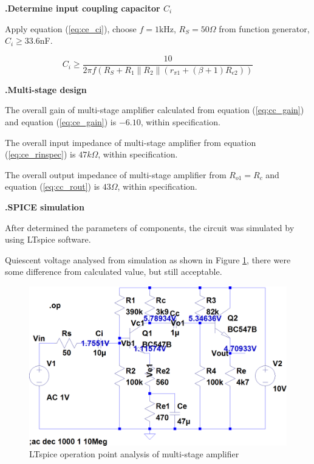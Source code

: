\documentclass[a4paper,notitlepage,10pt]{report}
\newcommand{\tab}{\hspace{0.75cm}}
\newcommand{\fontHeading}{\fontsize{12pt}{13.2pt}\selectfont}
\newcommand{\fontSubHeading}{\fontsize{10pt}{11pt}\selectfont}
\newcommand{\fontBody}{\fontsize{10pt}{11pt}\selectfont}
\newcounter{sections}
\newcounter{subsections}[sections]
\begin{document}
\begin{multicols}{2}
\fontSubHeading
{}
\textbf{.\tab Determine input coupling capacitor $C_i$}

Apply equation (\ref{eq:ce_ci}), choose $f = 1$kHz, $R_S = 50\Omega$ from function generator, $C_i \geq 33.6$nF.
\parskip=0pt

\begin{equation}
	\label{eq:ce_ci}
	C_i \geq \frac{10}{2\pi f\left(R_S + R_1 \| R_2 \| \left(r_{\pi1} + \left(\beta + 1\right)R_{e2}\right)\right)}
\end{equation}
\parskip=10pt


\fontHeading
{}
\textbf{.\tab Multi-stage design}

\fontBody
The overall gain of multi-stage amplifier calculated from equation (\ref{eq:cc_gain}) and equation (\ref{eq:ce_gain}) is $-6.10$, within specification.
\parskip=6pt

The overall input impedance of multi-stage amplifier from equation (\ref{eq:ce_rinspec}) is $47k\Omega$, within specification.

The overall output impedance of multi-stage amplifier from $R_{o1} = R_c$ and equation (\ref{eq:cc_rout}) is $43\Omega$, within specification.
\parskip=10pt


\fontHeading
{}
\textbf{.\tab SPICE simulation}

\fontBody
After determined the parameters of components, the circuit was simulated by using LTspice software.
\parskip=6pt

Quiescent voltage analysed from simulation as shown in Figure \ref{fig:simulation}, there were some difference from calculated value, but still acceptable.
\parskip=0pt

\begin{figure}[H]
	\centering
	\includegraphics[width=0.8\columnwidth]{simulation}
	\caption{LTspice operation point analysis of multi-stage amplifier}
	\label{fig:simulation}
\end{figure}
\parskip=6pt


\end{multicols}
\end{document}
